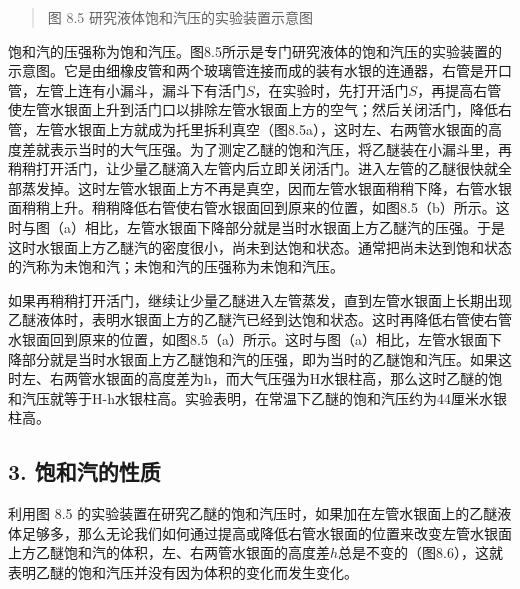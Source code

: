 \begin{quote}
图 8.5 研究液体饱和汽压的实验装置示意图
\end{quote}

饱和汽的压强称为饱和汽压。图8.5所示是专门研究液体的饱和汽压的实验装置的示意图。它是由细橡皮管和两个玻璃管连接而成的装有水银的连通器，右管是开口管，左管上连有小漏斗，漏斗下有活门\(S\)，在实验时，先打开活门\(S\)，再提高右管使左管水银面上升到活门口以排除左管水银面上方的空气；然后关闭活门，降低右管，左管水银面上方就成为托里拆利真空（图8.5a），这时左、右两管水银面的高度差就表示当时的大气压强。为了测定乙醚的饱和汽压，将乙醚装在小漏斗里，再稍稍打开活门，让少量乙醚滴入左管内后立即关闭活门。进入左管的乙醚很快就全部蒸发掉。这时左管水银面上方不再是真空，因而左管水银面稍稍下降，右管水银面稍稍上升。稍稍降低右管使右管水银面回到原来的位置，如图8.5（b）所示。这时与图（a）相比，左管水银面下降部分就是当时水银面上方乙醚汽的压强。于是这时水银面上方乙醚汽的密度很小，尚未到达饱和状态。通常把尚未达到饱和状态的汽称为未饱和汽；未饱和汽的压强称为未饱和汽压。

如果再稍稍打开活门，继续让少量乙醚进入左管蒸发，直到左管水银面上长期出现乙醚液体时，表明水银面上方的乙醚汽已经到达饱和状态。这时再降低右管使右管水银面回到原来的位置，如图8.5（a）所示。这时与图（a）相比，左管水银面下降部分就是当时水银面上方乙醚饱和汽的压强，即为当时的乙醚饱和汽压。如果这时左、右两管水银面的高度差为h，而大气压强为H水银柱高，那么这时乙醚的饱和汽压就等于H-h水银柱高。实验表明，在常温下乙醚的饱和汽压约为44厘米水银柱高。

\subsection{3. 饱和汽的性质}\label{ux9971ux548cux6c7dux7684ux6027ux8d28}

利用图 8.5
的实验装置在研究乙醚的饱和汽压时，如果加在左管水银面上的乙醚液体足够多，那么无论我们如何通过提高或降低右管水银面的位置来改变左管水银面上方乙醚饱和汽的体积，左、右两管水银面的高度差\(h\)总是不变的（图8.6），这就表明乙醚的饱和汽压并没有因为体积的变化而发生变化。

